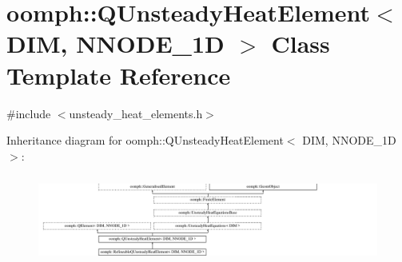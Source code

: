 \hypertarget{classoomph_1_1QUnsteadyHeatElement}{}\section{oomph\+:\+:Q\+Unsteady\+Heat\+Element$<$ D\+IM, N\+N\+O\+D\+E\+\_\+1D $>$ Class Template Reference}
\label{classoomph_1_1QUnsteadyHeatElement}


{\ttfamily \#include $<$unsteady\+\_\+heat\+\_\+elements.\+h$>$}

Inheritance diagram for oomph\+:\+:Q\+Unsteady\+Heat\+Element$<$ D\+IM, N\+N\+O\+D\+E\+\_\+1D $>$\+:\begin{figure}[H]
\begin{center}
\leavevmode
\includegraphics[height=2.955145cm]{classoomph_1_1QUnsteadyHeatElement}
\end{center}
\end{figure}
